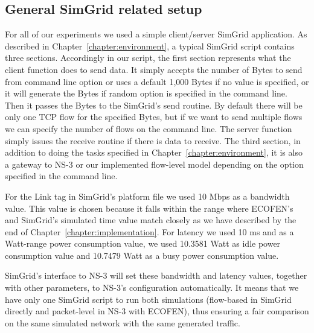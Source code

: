 \subsection{General SimGrid related setup}
For all of our experiments we used a simple client/server SimGrid application. As described in Chapter~\ref{chapter:environment}, a typical SimGrid script contains three sections. Accordingly in our script, the first section represents what the client function does to send data. It simply accepts the number of Bytes to send from command line option or uses a default 1,000 Bytes if no value is specified, or it will generate the Bytes if random option is specified in the command line. Then it passes the Bytes to the SimGrid's send routine. By default there will be only one TCP flow for the specified Bytes, but if we want to send multiple flows we can specify the number of flows on the command line. The server function simply issues the receive routine if there is data to receive. The third section, in addition to doing the tasks specified in Chapter~\ref{chapter:environment},  it is also a gateway to NS-3 or our implemented flow-level model depending on the option specified in the command line. 

For the Link tag in SimGrid's platform file we used 10 Mbps  as a bandwidth value. This value is chosen because it falls within the range where ECOFEN's and SimGrid's simulated time value match closely as we have described by the end of Chapter~\ref{chapter:implementation}. For latency we used 10 ms and as a Watt-range power consumption value, we used 10.3581 Watt as idle power consumption value and 10.7479 Watt as a busy power consumption value. 

SimGrid's interface to NS-3 will set these bandwidth and latency values, together with other parameters, to NS-3's configuration automatically. It means that we have only one SimGrid script to run both simulations (flow-based in SimGrid directly and packet-level in NS-3 with ECOFEN), thus ensuring a fair comparison on the same simulated network with the same generated traffic. 

